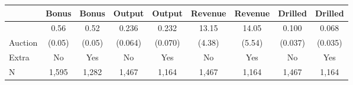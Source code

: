 
\begin{tabular}{lcccccccc}
\toprule
 & Bonus & Bonus & Output & Output & Revenue & Revenue & Drilled & Drilled\\
\midrule
 & 0.56 & 0.52 & 0.236 & 0.232 & 13.15 & 14.05 & 0.100 & 0.068\\

\multirow{-2}{*}{\raggedright\arraybackslash Auction} & (0.05) & (0.05) & (0.064) & (0.070) & (4.38) & (5.54) & (0.037) & (0.035)\\

\midrule
Extra & No & Yes & No & Yes & No & Yes & No & Yes\\
\midrule

N & 1,595 & 1,282 & 1,467 & 1,164 & 1,467 & 1,164 & 1,467 & 1,164\\
\bottomrule
\end{tabular}
